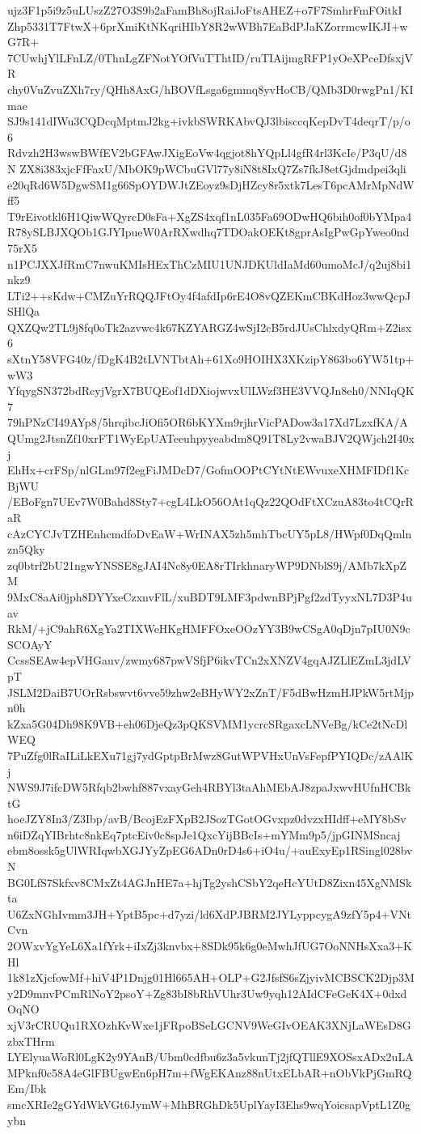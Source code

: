 ujz3F1p5i9z5uLUszZ27O3S9b2aFamBh8ojRaiJoFtsAHEZ+o7F7SmhrFmFOitkI
Zhp5331T7FtwX+6prXmiKtNKqriHIbY8R2wWBh7EaBdPJaKZorrmcwIKJI+wG7R+
7CUwhjYlLFnLZ/0ThnLgZFNotYOfVuTThtID/ruTIAijmgRFP1yOeXPceDfsxjVR
chy0VuZvuZXh7ry/QHh8AxG/hBOVfLsga6gmmq8yvHoCB/QMb3D0rwgPn1/KImae
SJ9s141dIWu3CQDcqMptmJ2kg+ivkbSWRKAbvQJ3lbisccqKepDvT4deqrT/p/o6
Rdvzh2H3wswBWfEV2bGFAwJXigEoVw4qgjot8hYQpLl4gfR4rl3KcIe/P3qU/d8N
ZX8i383xjcFfFaxU/MbOK9pWCbuGVl77y8iN8t8IxQ7Zs7fkJ8etGjdmdpei3qli
e20qRd6W5DgwSM1g66SpOYDWJtZEoyz9sDjHZcy8r5xtk7LesT6pcAMrMpNdWff5
T9rEivotkl6H1QiwWQyrcD0sFa+XgZS4xqf1nL035Fa69ODwHQ6bih0of0bYMpa4
R78ySLBJXQOb1GJYIpueW0ArRXwdhq7TDOakOEKt8gprAsIgPwGpYweo0nd75rX5
n1PCJXXJfRmC7nwuKMIsHExThCzMIU1UNJDKUldIaMd60umoMcJ/q2uj8bi1nkz9
LTi2++sKdw+CMZuYrRQQJFtOy4f4afdIp6rE4O8vQZEKmCBKdHoz3wwQcpJSHlQa
QXZQw2TL9j8fq0oTk2azvwc4k67KZYARGZ4wSjI2cB5rdJUsChlxdyQRm+Z2isx6
sXtnY58VFG40z/fDgK4B2tLVNTbtAh+61Xo9HOIHX3XKzipY863bo6YW51tp+wW3
YfqygSN372bdRcyjVgrX7BUQEof1dDXiojwvxUlLWzf3HE3VVQJn8eh0/NNIqQK7
79hPNzCI49AYp8/5hrqibcJiOfi5OR6bKYXm9rjhrVicPADow3a17Xd7LzxfKA/A
QUmg2JtsnZf10xrFT1WyEpUATeeuhpyyeabdm8Q91T8Ly2vwaBJV2QWjch2I40xj
EhHx+crFSp/nlGLm97f2egFiJMDcD7/GofmOOPtCYtNtEWvuxeXHMFIDf1KcBjWU
/EBoFgn7UEv7W0Bahd8Sty7+cgL4LkO56OAt1qQz22QOdFtXCzuA83to4tCQrRaR
cAzCYCJvTZHEnhcmdfoDvEaW+WrINAX5zh5mhTbcUY5pL8/HWpf0DqQmlnzn5Qky
zq0btrf2bU21ngwYNSSE8gJAI4Nc8y0EA8rTIrkhnaryWP9DNblS9j/AMb7kXpZM
9MxC8aAi0jph8DYYxeCzxnvFlL/xuBDT9LMF3pdwnBPjPgf2zdTyyxNL7D3P4uav
RkM/+jC9ahR6XgYa2TIXWeHKgHMFFOxeOOzYY3B9wCSgA0qDjn7pIU0N9cSCOAyY
CcssSEAw4epVHGauv/zwmy687pwVSfjP6ikvTCn2xXNZV4gqAJZLlEZmL3jdLVpT
JSLM2DaiB7UOrRsbswvt6vve59zhw2eBHyWY2xZnT/F5dBwHzmHJPkW5rtMjpn0h
kZxa5G04Dh98K9VB+eh06DjeQz3pQKSVMM1ycrcSRgaxcLNVeBg/kCe2tNcDlWEQ
7PuZfg0lRaILiLkEXu71gj7ydGptpBrMwz8GutWPVHxUnVsFepfPYIQDc/zAAlKj
NWS9J7ifcDW5Rfqb2bwhf887vxayGeh4RBYl3taAhMEbAJ8zpaJxwvHUfnHCBktG
hoeJZY8In3/Z3Ibp/avB/BcojEzFXpB2JSozTGotOGvxpz0dvzxHIdff+eMY8bSv
n6iDZqYIBrhtc8nkEq7ptcEiv0c8spJe1QxcYijBBcIs+mYMm9p5/jpGINMSncaj
ebm8ossk5gUlWRIqwbXGJYyZpEG6ADn0rD4s6+iO4u/+auExyEp1RSingl028bvN
BG0LfS7Skfxv8CMxZt4AGJnHE7a+hjTg2yshCSbY2qeHcYUtD8Zixn45XgNMSkta
U6ZxNGhIvmm3JH+YptB5pc+d7yzi/ld6XdPJBRM2JYLyppcygA9zfY5p4+VNtCvn
2OWxvYgYeL6Xa1fYrk+iIxZj3knvbx+8SDk95k6g0eMwhJfUG7OoNNHsXxa3+KHl
1k81zXjcfowMf+hiV4P1Dnjg01Hl665AH+OLP+G2JfsfS6sZjyivMCBSCK2Djp3M
y2D9mnvPCmRlNoY2psoY+Zg83bI8bRhVUhr3Uw9yqh12AIdCFeGeK4X+0dxdOqNO
xjV3rCRUQu1RXOzhKvWxe1jFRpoBSeLGCNV9WeGIvOEAK3XNjLaWEsD8GzbxTHrm
LYElyuaWoRl0LgK2y9YAnB/Ubm0cdfbu6z3a5vkunTj2jfQTllE9XOSsxADx2uLA
MPknf0c58A4eGlFBUgwEn6pH7m+fWgEKAnz88nUtxELbAR+nObVkPjGmRQEm/Ibk
smcXRIe2gGYdWkVGt6JymW+MhBRGhDk5UplYayI3Ehs9wqYoicsapVptL1Z0gybn

